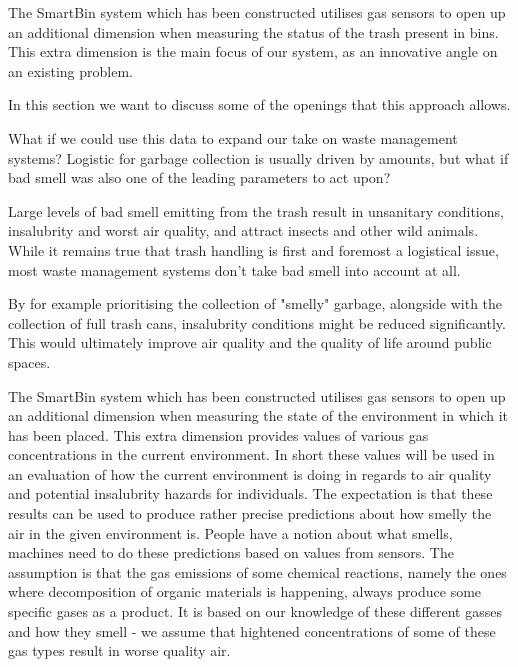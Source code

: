 \iffalse
discussion

here emphasize  about the famous What IF question

take this INNOVATIVE aspect and use it in waste management

in the conclusion:
we can build it, it works, the technology is out there
in the discussion:
it can be applied somewhere else
it can extend other systems
used for innovation
it's a different take
\fi

The SmartBin system which has been constructed utilises gas sensors to open up an additional dimension when measuring the status of the trash present in bins.
This extra dimension is the main focus of our system, as an innovative angle on an existing problem.

In this section we want to discuss some of the openings that this approach allows.

What if we could use this data to expand our take on waste management systems?
Logistic for garbage collection is usually driven by amounts, but what if bad smell was also one of the leading parameters to act upon?

Large levels of bad smell emitting from the trash result in unsanitary conditions, insalubrity and worst air quality, and attract insects and other wild animals.
While it remains true that trash handling is first and foremost a logistical issue, most waste management systems don't take bad smell into account at all.

By for example prioritising the collection of "smelly" garbage, alongside with the collection of full trash cans, insalubrity conditions might be reduced significantly.
This would ultimately improve air quality and the quality of life around public spaces.

 

\iffalse
The SmartBin system which has been constructed utilises gas sensors to open up an additional dimension when measuring the state of the environment in which it has been placed.
This extra dimension provides values of various gas concentrations in the current environment.
In short these values will be used in an evaluation of how the current environment is doing in regards to air quality and potential insalubrity hazards for individuals.
The expectation is that these results can be used to produce rather precise predictions about how smelly the air in the given environment is.
People have a notion about what smells, machines need to do these predictions based on values from sensors.
The assumption is that the gas emissions of some chemical reactions, namely the ones where decomposition of organic materials is happening, always produce some specific gases as a product.
It is based on our knowledge of these different gasses and how they smell - we assume that hightened concentrations of some of these gas types result in worse quality air.


